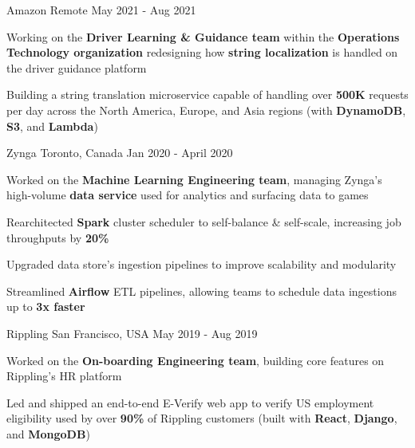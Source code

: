 \documentclass[11pt, a4paper]{awesome-cv}
\begin{document}
\makecvheader





\begin{siderules1}
\begin{cventries}
    \cventry
    {\textit{}}
    {Amazon}
    {Remote}
    {May 2021 - Aug 2021}
    {
      \begin{cvitems}
        \item {Working on the \textbf{Driver Learning \& Guidance team} within the \textbf{Operations Technology organization} redesigning how \textbf{string localization} is handled on the driver guidance platform}
        \item {Building a string translation microservice capable of handling over \textbf{500K} requests per day across the North America, Europe, and Asia regions (with \textbf{DynamoDB}, \textbf{S3}, and \textbf{Lambda})}
      \end{cvitems}
    }
    \cventry
    {\textit{}}
    {Zynga}
    {Toronto, Canada}
    {Jan 2020 - April 2020}
    {
      \begin{cvitems}
        \item {Worked on the \textbf{Machine Learning Engineering team}, managing Zynga's high-volume \textbf{data service} used for analytics and surfacing data to games}
        \item {Rearchitected \textbf{Spark} cluster scheduler to self-balance \& self-scale, increasing job throughputs by \textbf{20\%}}
        \item {Upgraded data store’s ingestion pipelines to improve scalability and modularity}
        \item {Streamlined \textbf{Airflow} ETL pipelines, allowing teams to schedule data ingestions up to \textbf{3x faster}}
      \end{cvitems}
    }
    \cventry
    {\textit{}}
    {Rippling}
    {San Francisco, USA}
    {May 2019 - Aug 2019}
    {
      \begin{cvitems}
        \item {Worked on the \textbf{On-boarding Engineering team}, building core features on Rippling's HR platform}
        \item {Led and shipped an end-to-end E-Verify web app to verify US employment eligibility used by over \textbf{90\%} of Rippling customers (built with \textbf{React}, \textbf{Django}, and \textbf{MongoDB})}

\end{cvitems}}
\end{cventries}
\end{siderules1}
\end{document}
